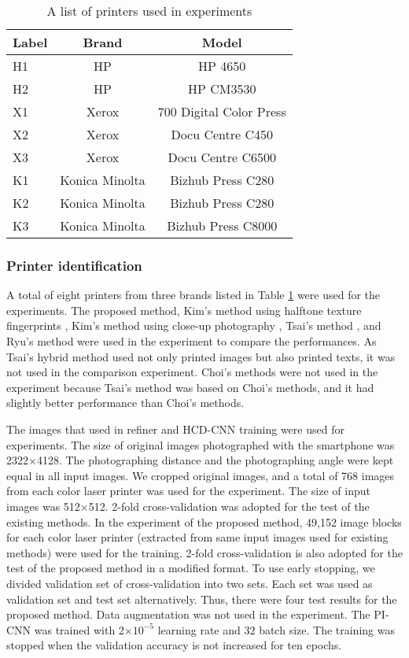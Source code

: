 \documentclass[5p, times]{elsarticle}
\begin{document}
\begin{table}[t]
\small
\caption{A list of printers used in experiments}
\begin{center}
\begin{tabular}{lcc}
\hline
\textbf{Label}    & \textbf{Brand} & \textbf{Model} \\
\hline
H1  & HP & HP 4650 \\
H2 & HP & HP CM3530 \\
X1 & Xerox & 700 Digital Color Press \\
X2 & Xerox & Docu Centre C450 \\
X3 & Xerox & Docu Centre C6500 \\
K1 & Konica Minolta & Bizhub Press C280 \\
K2 & Konica Minolta & Bizhub Press C280 \\ 
K3 & Konica Minolta & Bizhub Press C8000 \\
\hline
\end{tabular}
\end{center}
\label{printers}
\end{table}

\subsubsection{Printer identification}
A total of eight printers from three brands listed in Table \ref{printers} were used for the experiments. The proposed method, Kim's method using halftone texture fingerprints \cite{Kim2}, Kim's method using close-up photography \cite{Kim1}, Tsai's method \cite{Tsai1}, and Ryu's method \cite{Ryu} were used in the experiment to compare the performances. As Tsai's hybrid method \cite{Tsai2} used not only printed images but also printed texts, it was not used in the comparison experiment. Choi's methods \cite{Choi1}\cite{Choi2} were not used in the experiment because Tsai's method \cite{Tsai1} was based on Choi's methods, and it had slightly better performance than Choi's methods.

The images that used in refiner and HCD-CNN training were used for experiments. The size of original images photographed with the smartphone was 2322$\times$4128. The photographing distance and the photographing angle were kept equal in all input images. We cropped original images, and a total of 768 images from each color laser printer was used for the experiment. The size of input images was 512$\times$512. 2-fold cross-validation was adopted for the test of the existing methods. In the experiment of the proposed method, 49,152 image blocks for each color laser printer (extracted from same input images used for existing methods) were used for the training. 2-fold cross-validation is also adopted for the test of the proposed method in a modified format. To use early stopping, we divided validation set of cross-validation into two sets. Each set was used as validation set and test set alternatively. Thus, there were four test results for the proposed method. Data augmentation was not used in the experiment. The PI-CNN was trained with 2$\times10^{-5}$ learning rate and 32 batch size. The training was stopped when the validation accuracy is not increased for ten epochs.
\end{document}
